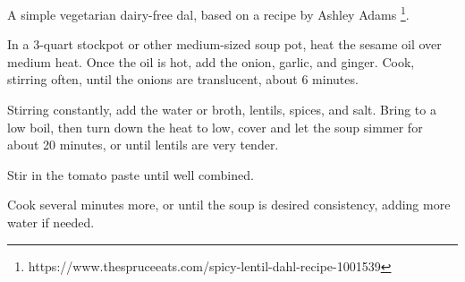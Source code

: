 
A simple vegetarian dairy-free dal, based on a recipe by Ashley Adams \footnote{https://www.thespruceeats.com/spicy-lentil-dahl-recipe-1001539}.


In a 3-quart stockpot or other medium-sized soup pot, heat the sesame oil over medium heat. Once the oil is hot, add the onion, garlic, and ginger. Cook, stirring often, until the onions are translucent, about 6 minutes.

\begin{ingredients}
\end{ingredients}

Stirring constantly, add the water or broth, lentils, spices, and salt. Bring to a low boil, then turn down the heat to low, cover and let the soup simmer for about 20 minutes, or until lentils are very tender.

\begin{ingredients}
\end{ingredients}

Stir in the tomato paste until well combined.

\begin{ingredients}
\end{ingredients}

Cook several minutes more, or until the soup is desired consistency, adding more water if needed.
